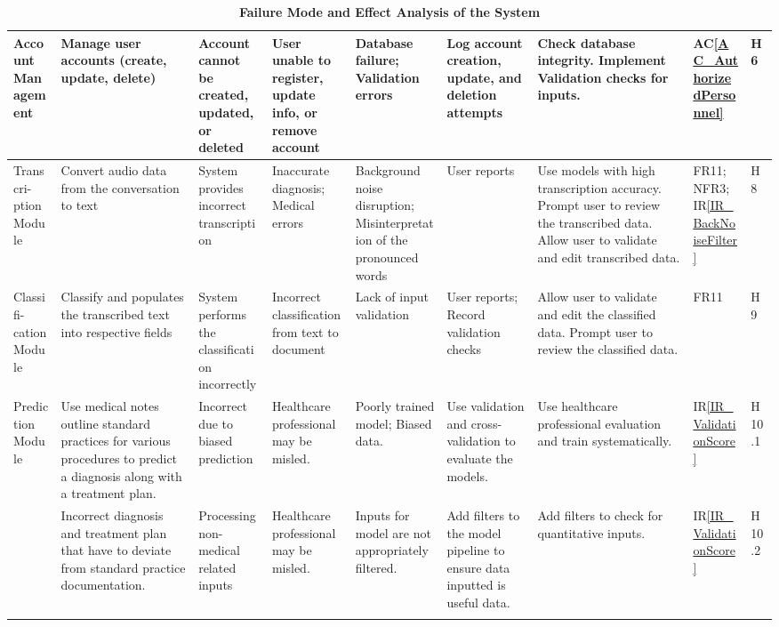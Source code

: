 \documentclass{article}
\begin{document}
\begin{landscape}
\begin{longtable}{|p{1.5cm}|p{2cm}|p{2.6cm}|p{2cm}|p{2cm}|p{2cm}|p{3.5cm}|p{1cm}|p{0.8cm}|}
        \midrule
        Account Management & \raggedright Manage user accounts (create, update, delete) & \raggedright Account cannot be created, updated, or deleted & \raggedright User unable to register, update info, or remove account & \raggedright Database failure; Validation errors & \raggedright Log account creation, update, and deletion attempts & \raggedright Check database integrity. Implement Validation checks for inputs. & AC\ref{AC_AuthorizedPersonnel} & H6 \\ 
        \midrule
        Transcri- ption Module & \raggedright Convert audio data from the conversation to text & \raggedright System provides incorrect transcription & \raggedright Inaccurate diagnosis; Medical errors & \raggedright Background noise disruption; Misinterpretation of the pronounced words & \raggedright User reports & \raggedright Use models with high transcription accuracy. Prompt user to review the transcribed data. Allow user to validate and edit transcribed data. & FR11; NFR3; IR\ref{IR_BackNoiseFilter} & H8 \\ 
        \midrule
        Classifi- cation Module & \raggedright Classify and populates the transcribed text into respective fields & \raggedright System performs the classification incorrectly & \raggedright Incorrect classification from text to document & \raggedright Lack of input validation & \raggedright User reports; Record validation checks & \raggedright Allow user to validate and edit the classified data. Prompt user to review the classified data. & FR11 & H9 \\
        \midrule
        Prediction Module & \raggedright Use medical notes outline standard practices for various procedures to predict a diagnosis along with a treatment plan. & \raggedright Incorrect due to biased prediction & \raggedright Healthcare professional may be misled. & \raggedright Poorly trained model; Biased data. & \raggedright Use validation and cross-validation to evaluate the models. & \raggedright Use healthcare professional evaluation and train systematically. & IR\ref{IR_ValidationScore} & H10.1 \\
        \midrule
        & \raggedright Incorrect diagnosis and treatment plan that have to deviate from standard practice documentation. & \raggedright Processing non-medical related inputs & \raggedright Healthcare professional may be misled. & \raggedright Inputs for model are not appropriately filtered. & \raggedright Add filters to the model pipeline to ensure data inputted is useful data. & \raggedright Add filters to check for quantitative inputs. & IR\ref{IR_ValidationScore} & H10.2 \\ 
        \bottomrule
        \caption{\bf Failure Mode and Effect Analysis of the System}
    \end{longtable}
    
    
\end{landscape}
\end{document}
